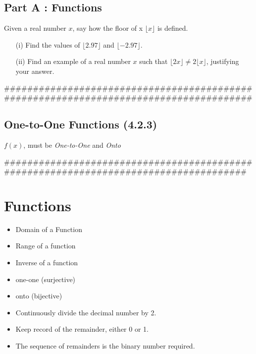 


\subsection*{Part A : Functions}
Given a real number $x$, say how the floor of x  $\lfloor x \rfloor$ is defined.
\begin{itemize}
\item[(i)] Find the values of $\lfloor 2.97 \rfloor$ and $\lfloor -2.97 \rfloor$.
\item[(ii)] Find an example of a real number $x$ such that $\lfloor 2x \rfloor  \neq 2\lfloor x \rfloor$, justifying your answer.
\end{itemize}

######################################################################################

\subsection*{One-to-One Functions (4.2.3)}
$f(x)$, must be \emph{One-to-One} and \emph{Onto}


#####################################################################################

\section*{Functions}
\begin{itemize}
\item Domain of a Function
\item Range of a function
\item Inverse of a function
\end{itemize}
\begin{itemize}
\item one-one (surjective)
\item onto (bijective)
\end{itemize}




\begin{itemize}
\item Continuously divide the decimal number by 2.
\item Keep record of the remainder, either 0 or 1.
\item The sequence of remainders is the binary number required.
\end{itemize}

